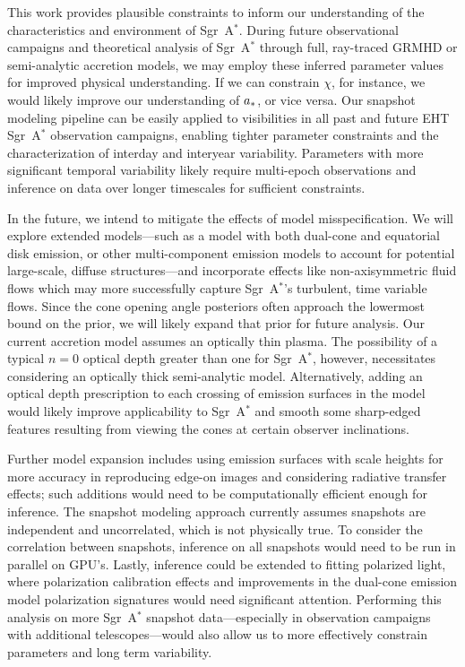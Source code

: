 \documentclass[linenumbers, twocolumn, tighten]{aastex701}
\def\sgra{Sgr~A$^*$\xspace}
\begin{document}
This work provides plausible constraints to inform our understanding of the characteristics and environment of \sgra. During future observational campaigns and theoretical analysis of \sgra through full, ray-traced GRMHD or semi-analytic accretion models, we may employ these inferred parameter values for improved physical understanding. If we can constrain $\chi$, for instance, we would likely improve our understanding of $a_{\rm *}$, or vice versa. Our snapshot modeling pipeline can be easily applied to visibilities in all past and future EHT \sgra observation campaigns, enabling tighter parameter constraints and the characterization of interday and interyear variability. Parameters with more significant temporal variability likely require multi-epoch observations and inference on data over longer timescales for sufficient constraints.

In the future, we intend to mitigate the effects of model misspecification. We will explore extended models---such as a model with both dual-cone and equatorial disk emission, or other multi-component emission models to account for potential large-scale, diffuse structures---and incorporate effects like non-axisymmetric fluid flows which may more successfully capture \sgra's turbulent, time variable flows. Since the cone opening angle posteriors often approach the lowermost bound on the prior, we will likely expand that prior for future analysis. Our current accretion model assumes an optically thin plasma. The possibility of a typical $n = 0$ optical depth greater than one for \sgra, however, necessitates considering an optically thick semi-analytic model. Alternatively, adding an optical depth prescription to each crossing of emission surfaces in the model would likely improve applicability to \sgra and smooth some sharp-edged features resulting from viewing the cones at certain observer inclinations.

Further model expansion includes using emission surfaces with scale heights for more accuracy in reproducing edge-on images and considering radiative transfer effects; such additions would need to be computationally efficient enough for inference. The snapshot modeling approach currently assumes snapshots are independent and uncorrelated, which is not physically true. To consider the correlation between snapshots, inference on all snapshots would need to be run in parallel on GPU's. Lastly, inference could be extended to fitting polarized light, where polarization calibration effects and improvements in the dual-cone emission model polarization signatures would need significant attention. Performing this analysis on more \sgra snapshot data---especially in observation campaigns with additional telescopes---would also allow us to more effectively constrain parameters and long term variability.
\end{document}

